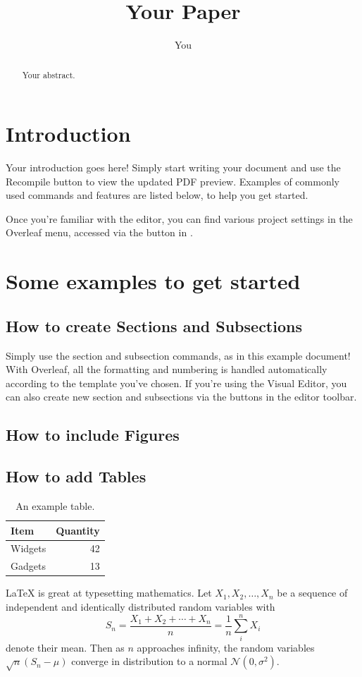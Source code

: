 \documentclass{article}
\title{Your Paper}
\author{You}
\begin{document}
\maketitle

\begin{abstract}
Your abstract.
\end{abstract}

\section{Introduction}

Your introduction goes here! Simply start writing your document and use the Recompile button to view the updated PDF preview. Examples of commonly used commands and features are listed below, to help you get started.

Once you're familiar with the editor, you can find various project settings in the Overleaf menu, accessed via the button in .

\section{Some examples to get started}

\subsection{How to create Sections and Subsections}

Simply use the section and subsection commands, as in this example document! With Overleaf, all the formatting and numbering is handled automatically according to the template you've chosen. If you're using the Visual Editor, you can also create new section and subsections via the buttons in the editor toolbar.

\subsection{How to include Figures}


\subsection{How to add Tables}


\begin{table}
\centering
\begin{tabular}{l|r}
Item & Quantity  \\\hline
Widgets & 42 \\
Gadgets & 13
\end{tabular}
\caption{\label{tab:widgets}An example table.}
\end{table}
\LaTeX{} is great at typesetting mathematics. Let $X_1, X_2, \ldots, X_n$ be a sequence of independent and identically distributed random variables with
\[S_n = \frac{X_1 + X_2 + \cdots + X_n}{n}
      = \frac{1}{n}\sum_{i}^{n} X_i\]
denote their mean. Then as $n$ approaches infinity, the random variables $\sqrt{n}(S_n - \mu)$ converge in distribution to a normal $\mathcal{N}(0, \sigma^2)$.
\end{document}
